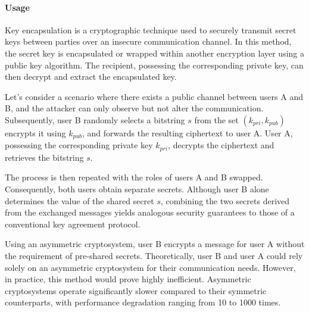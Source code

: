\paragraph*{Usage}
Key encapsulation is a cryptographic technique used to securely transmit secret keys between parties over an insecure communication channel. 
In this method, the secret key is encapsulated or wrapped within another encryption layer using a public key algorithm. 
The recipient, possessing the corresponding private key, can then decrypt and extract the encapsulated key.
\begin{example}
    Let's consider a scenario where there exists a public channel between users A and B, and the attacker can only observe but not alter the communication.
    Subsequently, user B randomly selects a bitstring $s$ from the set $\left(k_{pri},k_{pub}\right)$ encrypts it using $k_{pub}$, and forwards the resulting ciphertext to user A. 
    User A, possessing the corresponding private key $k_{pri}$, decrypts the ciphertext and retrieves the bitstring $s$. 

    The process is then repeated with the roles of users A and B swapped. 
    Consequently, both users obtain separate secrets. 
    Although user B alone determines the value of the shared secret $s$, combining the two secrets derived from the exchanged messages yields analogous security guarantees to those of a conventional key agreement protocol.
\end{example}
Using an asymmetric cryptosystem, user B encrypts a message for user A without the requirement of pre-shared secrets. 
Theoretically, user B and user A could rely solely on an asymmetric cryptosystem for their communication needs. 
However, in practice, this method would prove highly inefficient.
Asymmetric cryptosystems operate significantly slower compared to their symmetric counterparts, with performance degradation ranging from 10 to 1000 times.

